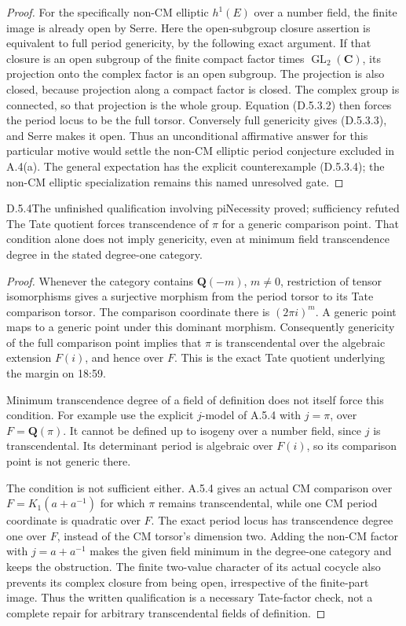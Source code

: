 \begin{proof}
For the specifically non-CM elliptic \(h^1(E)\) over a number
field, the finite image is already open by Serre. Here the
open-subgroup closure assertion is equivalent to full period
genericity, by the following exact argument. If that closure is
an open subgroup of the finite compact factor times
\(\operatorname{GL}_2(\mathbf C)\), its projection onto the
complex factor is an open subgroup. The projection is also
closed, because projection along a compact factor is closed.
The complex group is connected, so that projection is the whole
group. Equation (D.5.3.2) then forces the period locus to be
the full torsor. Conversely full genericity gives
(D.5.3.3), and Serre makes it open. Thus an unconditional
affirmative answer for this particular motive would settle the
non-CM elliptic period conjecture excluded in A.4(a). The
general expectation has the explicit counterexample (D.5.3.4);
the non-CM elliptic specialization remains this named unresolved
gate.
\end{proof}

\begin{result}{D.5.4}{The unfinished qualification involving pi}{Necessity proved; sufficiency refuted}
The Tate quotient forces transcendence of $\pi$ for a generic comparison point. That condition alone does not imply genericity, even at minimum field transcendence degree in the stated degree-one category.
\end{result}
\begin{proof}
Whenever the
category contains \(\mathbf Q(-m)\), \(m\ne0\), restriction of
tensor isomorphisms gives a surjective morphism from the period
torsor to its Tate comparison torsor. The comparison coordinate
there is \((2\pi i)^m\). A generic point maps to a generic point
under this dominant morphism. Consequently genericity of the
full comparison point implies that \(\pi\) is transcendental
over the algebraic extension \(F(i)\), and hence over \(F\).
This is the exact Tate quotient underlying the margin on 18:59.

Minimum transcendence degree of a field of definition does not
itself force this condition. For example use the explicit
\(j\)-model of A.5.4 with \(j=\pi\), over \(F=\mathbf Q(\pi)\).
It cannot be defined up to isogeny over a number field, since
\(j\) is transcendental. Its determinant period is algebraic
over \(F(i)\), so its comparison point is not generic there.

The condition is not sufficient either. A.5.4 gives an actual
CM comparison over \(F=K_1(a+a^{-1})\) for which \(\pi\) remains
transcendental, while one CM period coordinate is quadratic over
\(F\). The exact period locus has transcendence degree one
over \(F\), instead of the CM torsor's dimension two. Adding
the non-CM factor with \(j=a+a^{-1}\) makes the given field
minimum in the degree-one category and keeps the obstruction.
The finite two-value character of its actual cocycle also
prevents its complex closure from being open, irrespective of
the finite-part image. Thus the written qualification is a
necessary Tate-factor check, not a complete repair for arbitrary
transcendental fields of definition.
\end{proof}

